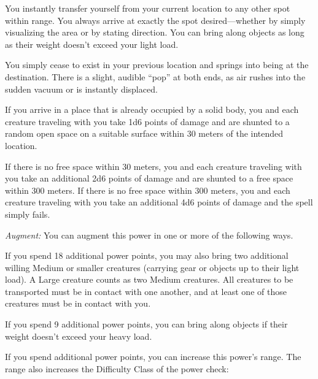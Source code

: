 {
	You instantly transfer yourself from your current location to any other spot within range. You always arrive at exactly the spot desired---whether by simply visualizing the area or by stating direction. You can bring along objects as long as their weight doesn't exceed your light load.

	You simply cease to exist in your previous location and springs into being at the destination. There is a slight, audible ``pop'' at both ends, as air rushes into the sudden vacuum or is instantly displaced.

	If you arrive in a place that is already occupied by a solid body, you and each creature traveling with you take 1d6 points of damage and are shunted to a random open space on a suitable surface within 30 meters of the intended location.

	If there is no free space within 30 meters, you and each creature traveling with you take an additional 2d6 points of damage and are shunted to a free space within 300 meters. If there is no free space within 300 meters, you and each creature traveling with you take an additional 4d6 points of damage and the spell simply fails.

	\textit{Augment:} You can augment this power in one or more of the following ways.
	\begin{enumerate*}
	\item If you spend 18 additional power points, you may also bring two additional willing Medium or smaller creatures (carrying gear or objects up to their light load). A Large creature counts as two Medium creatures. All creatures to be transported must be in contact with one another, and at least one of those creatures must be in contact with you.
	\item If you spend 9 additional power points, you can bring along objects if their weight doesn't exceed your heavy load.
	\item If you spend additional power points, you can increase this power's range. The range also increases the Difficulty Class of the power check: 
	\end{enumerate*}


}